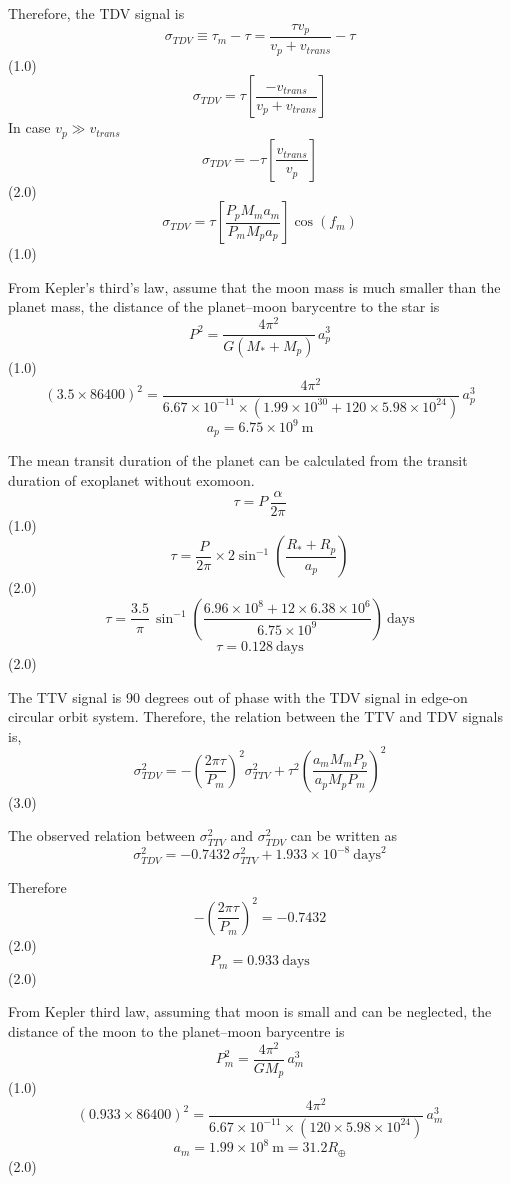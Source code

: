 \begin{description}
Therefore, the TDV signal is
\[ \sigma_{TDV} \equiv \tau_m - \tau
   = \frac{\tau v_p}{v_p + v_{trans}} - \tau \]
\hfill(1.0)
\[ \sigma_{TDV} = \tau\left[\frac{-v_{trans}}{v_p + v_{trans}}\right] \]
In case $v_p \gg v_{trans}$
\[ \sigma_{TDV} = -\tau\left[\frac{v_{trans}}{v_p}\right] \]
\hfill(2.0)
\[ \sigma_{TDV} = \tau\left[\frac{P_p M_m a_m}{P_m M_p a_p}\right]\cos(f_m) \]
\hfill(1.0)

\item[(c)] From Kepler's third's law, assume that the moon mass is much
smaller than the planet mass, the distance of the planet--moon barycentre to
the star is
\[ P^2 = \frac{4\pi^2}{G(M_* + M_p)}\,a_p^3 \]
\hfill(1.0)
\[ (3.5\times86400)^2
   = \frac{4\pi^2}{6.67\times10^{-11}\times(1.99\times10^{30}
     + 120\times5.98\times10^{24})}\,a_p^3 \]
\[ a_p = 6.75\times10^{9}\ \mathrm{m} \]

The mean transit duration of the planet can be calculated from the transit
duration of exoplanet without exomoon.
\[ \tau = P\,\frac{\alpha}{2\pi} \]
\hfill(1.0)
\[ \tau = \frac{P}{2\pi}\times 2\sin^{-1}\!\left(\frac{R_* + R_p}{a_p}\right) \]
\hfill(2.0)
\[ \tau = \frac{3.5}{\pi}\,\sin^{-1}\!\left(
   \frac{6.96\times10^{8} + 12\times6.38\times10^{6}}{6.75\times10^{9}}\right)
   \ \mathrm{days} \]
\[ \tau = 0.128\ \mathrm{days} \]
\hfill(2.0)

\item[(d)] The TTV signal is 90 degrees out of phase with the TDV signal in
edge-on circular orbit system. Therefore, the relation between the TTV and TDV
signals is,
\[ \sigma_{TDV}^2 = -\left(\frac{2\pi\tau}{P_m}\right)^2\sigma_{TTV}^2
   + \tau^2\left(\frac{a_m M_m P_p}{a_p M_p P_m}\right)^2 \]
\hfill(3.0)

The observed relation between $\sigma_{TTV}^2$ and $\sigma_{TDV}^2$ can be
written as
\[ \sigma_{TDV}^2 = -0.7432\,\sigma_{TTV}^2 + 1.933\times10^{-8}\ \mathrm{days}^2 \]

Therefore
\[ -\left(\frac{2\pi\tau}{P_m}\right)^2 = -0.7432 \]
\hfill(2.0)
\[ P_m = 0.933\ \mathrm{days} \]
\hfill(2.0)

\item[(e)] From Kepler third law, assuming that moon is small and can be
neglected, the distance of the moon to the planet--moon barycentre is
\[ P_m^2 = \frac{4\pi^2}{GM_p}\,a_m^3 \]
\hfill(1.0)
\[ (0.933\times86400)^2
   = \frac{4\pi^2}{6.67\times10^{-11}\times(120\times5.98\times10^{24})}\,a_m^3 \]
\[ a_m = 1.99\times10^{8}\ \mathrm{m} = 31.2 R_\oplus \]
\hfill(2.0)


\end{description}
